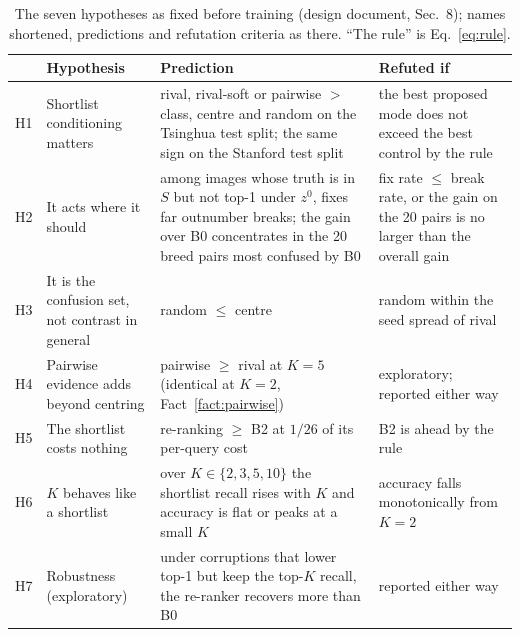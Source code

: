 \documentclass[11pt,a4paper]{article}
\theoremstyle{plain}
\begin{document}
\begin{table}[!htbp]
\centering
\caption{The seven hypotheses as fixed before training (design document, Sec.~8); names shortened, predictions
and refutation criteria as there. ``The rule'' is Eq.~\eqref{eq:rule}.}
\label{tab:hyp-design}
\small
\begin{tabularx}{\textwidth}{@{}lL{3.1cm}YL{4.3cm}@{}}
\toprule
 & Hypothesis & Prediction & Refuted if\\
\midrule
H1 & Shortlist conditioning matters & rival, rival-soft or pairwise $>$ class, centre and random on the Tsinghua test
split; the same sign on the Stanford test split & the best proposed mode does not exceed the best control by the
rule\\
H2 & It acts where it should & among images whose truth is in $S$ but not top-1 under $z^0$, fixes far outnumber
breaks; the gain over B0 concentrates in the 20 breed pairs most confused by B0 & fix rate $\le$ break rate, or the
gain on the 20 pairs is no larger than the overall gain\\
H3 & It is the confusion set, not contrast in general & random $\le$ centre & random within the seed spread of
rival\\
H4 & Pairwise evidence adds beyond centring & pairwise $\ge$ rival at $K=5$ (identical at $K=2$, Fact~\ref{fact:pairwise}) &
exploratory; reported either way\\
H5 & The shortlist costs nothing & re-ranking $\ge$ B2 at $1/26$ of its per-query cost & B2 is ahead by the rule\\
H6 & $K$ behaves like a shortlist & over $K\in\{2,3,5,10\}$ the shortlist recall rises with $K$ and accuracy is flat or
peaks at a small $K$ & accuracy falls monotonically from $K=2$\\
H7 & Robustness (exploratory) & under corruptions that lower top-1 but keep the top-$K$ recall, the re-ranker
recovers more than B0 & reported either way\\
\bottomrule
\end{tabularx}
\end{table}
\end{document}
